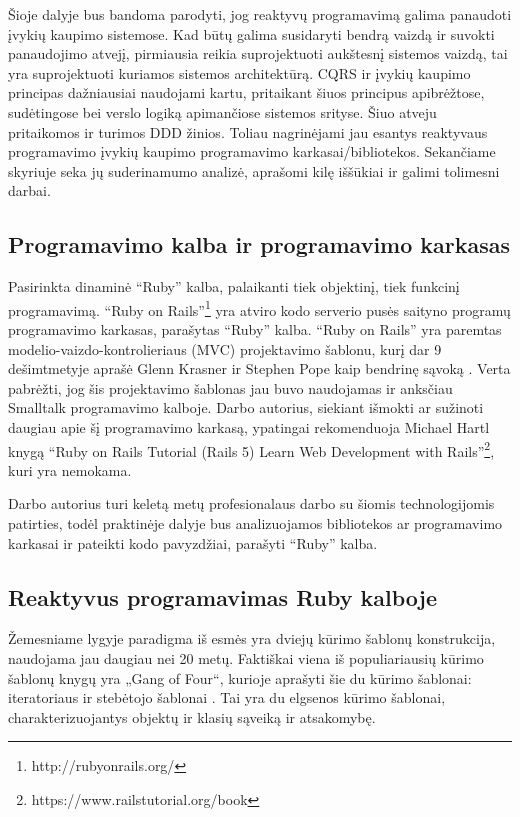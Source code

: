   Šioje dalyje bus bandoma parodyti, jog reaktyvų programavimą galima panaudoti įvykių kaupimo sistemose. Kad būtų galima susidaryti bendrą vaizdą ir suvokti panaudojimo atvejį, pirmiausia reikia suprojektuoti aukštesnį sistemos vaizdą, tai yra suprojektuoti kuriamos sistemos architektūrą. CQRS ir įvykių kaupimo principas dažniausiai naudojami kartu, pritaikant šiuos principus apibrėžtose, sudėtingose bei verslo logiką apimančiose sistemos srityse. Šiuo atveju pritaikomos ir turimos DDD žinios. Toliau nagrinėjami jau esantys reaktyvaus programavimo įvykių kaupimo programavimo karkasai/bibliotekos. Sekančiame skyriuje seka jų suderinamumo analizė, aprašomi kilę iššūkiai ir galimi tolimesni darbai.

\subsection{Programavimo kalba ir programavimo karkasas}

Pasirinkta dinaminė ``Ruby'' kalba, palaikanti tiek objektinį, tiek funkcinį programavimą. ``Ruby on Rails''\footnote{http://rubyonrails.org/} yra atviro kodo serverio pusės saityno programų programavimo karkasas, parašytas ``Ruby'' kalba. ``Ruby on Rails'' yra paremtas modelio-vaizdo-kontrolieriaus (MVC) projektavimo šablonu, kurį dar 9 dešimtmetyje aprašė Glenn Krasner ir Stephen Pope kaip bendrinę sąvoką \cite{Krasner:1988:CUM:50757.50759}. Verta pabrėžti, jog šis projektavimo šablonas jau buvo naudojamas ir anksčiau Smalltalk programavimo kalboje. Darbo autorius, siekiant išmokti ar sužinoti daugiau apie šį programavimo karkasą, ypatingai rekomenduoja Michael Hartl knygą ``Ruby on Rails Tutorial (Rails 5) Learn Web Development with Rails''\footnote{https://www.railstutorial.org/book}, kuri yra nemokama.

Darbo autorius turi keletą metų profesionalaus darbo su šiomis technologijomis patirties, todėl praktinėje dalyje bus analizuojamos bibliotekos ar programavimo karkasai ir pateikti kodo pavyzdžiai, parašyti ``Ruby'' kalba.

\subsection{Reaktyvus programavimas Ruby kalboje}

Žemesniame lygyje paradigma iš esmės yra dviejų kūrimo šablonų konstrukcija, naudojama jau daugiau nei 20 metų. Faktiškai viena iš populiariausių kūrimo šablonų knygų yra „Gang of Four“, kurioje aprašyti šie du kūrimo šablonai: iteratoriaus ir stebėtojo šablonai \cite{GOF:DesignPattern}. Tai yra du elgsenos kūrimo šablonai, charakterizuojantys objektų ir klasių sąveiką ir atsakomybę.


